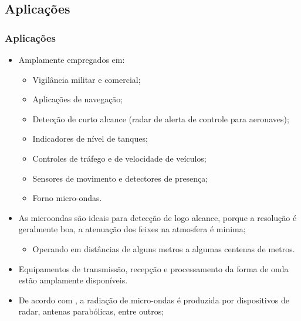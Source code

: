 \documentclass[xcolor=dvipsnames, aspectratio=169]{beamer}
\begin{document}
    \subsection[Aplicações]{Aplicações} 
    \begin{frame}
    \frametitle{Aplicações}
        \begin{itemize}
            \item Amplamente empregados em:
            \begin{itemize}
                \item Vigilância militar e comercial;
                \item Aplicações de navegação;
                \item Detecção de curto alcance (radar de alerta de controle para aeronaves);
                \item Indicadores de nível de tanques;
                \item Controles de tráfego e de velocidade de veículos;
                \item Sensores de movimento e detectores de presença;
                \item Forno micro-ondas.
            \end{itemize}
            \item As microondas são ideais para detecção de logo alcance, porque a resolução é geralmente boa, a atenuação dos feixes na atmosfera é minima;
            \begin{itemize}
                \item Operando em distâncias de alguns metros a algumas centenas de
                metros.
            \end{itemize}
            \item Equipamentos de transmissão, recepção e processamento da forma de onda estão amplamente disponíveis.
            \newpage
            \item De acordo com \cite{Agarwal_2021}, a radiação de micro-ondas é produzida por dispositivos de radar, antenas parabólicas, entre outros;
        \end{itemize}
    \end{frame}
\end{document}
